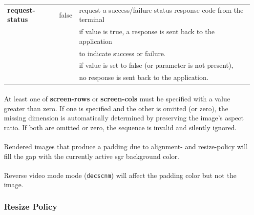 \documentclass[a4paper]{article}
\newcommand{\code}[1]{\colorbox{light-gray}{\texttt{#1}}}
\begin{document}
\begin{tabular}{|m{3cm}|m{2cm}|m{10cm}|}
    \textbf{request-status}   & false            & request a success/failure status response code from the terminal \\
                              &                  & if value is true, a response is sent back to the application \\
                              &                  & to indicate success or failure. \\
                              &                  & if value is set to false (or parameter is not present), \\
                              &                  & no response is sent back to the application. \\
    \hline
\end{tabular}

\paragraph*{}
At least one of \textbf{screen-rows} or \textbf{screen-cols} must be specified
with a value greater than zero. If one is specified and the other is omitted (or zero),
the missing dimension is automatically determined by preserving the image's aspect ratio.
If both are omitted or zero, the sequence is invalid and silently ignored.

\paragraph*{}
Rendered images that produce a padding due to alignment- and resize-policy
will fill the gap with the currently active sgr background color.

\paragraph*{}
Reverse video mode mode (\code{decscnm}) will affect the padding color but not the image.

\subsubsection*{Resize Policy}
\end{document}
